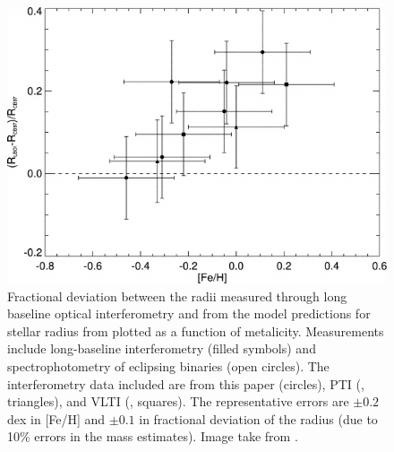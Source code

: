 \begin{figure}
    \centering
    \includegraphics[scale=0.5]{3-images/berger.png}
    \caption{Fractional deviation between the radii measured through long baseline optical interferometry and from the model predictions for stellar radius from \protect\citet{1997A&A...327.1039C} plotted as a function of metalicity. Measurements include long-baseline interferometry (filled symbols) and spectrophotometry of eclipsing binaries (open circles). The interferometry data included are from this paper (circles), PTI (\protect\citealt{2001ApJ...551L..81L}, triangles), and VLTI (\protect\citealt{2003A&A...397L...5S}, squares). The representative errors are $\pm0.2$ dex in [Fe/H] and $\pm0.1$ in fractional deviation of the radius (due to 10\% errors in the mass estimates). Image take from \protect\citet{2006ApJ...644..475B}.}
    \label{fig:berger_inflation}
\end{figure}


